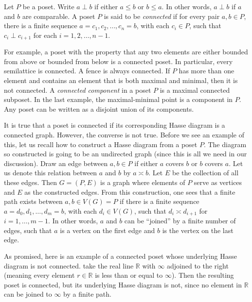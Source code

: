\documentclass[12pt]{article}
\begin{document}
Let $P$ be a poset.  Write $a\perp b$ if either $a\le b$ or $b\le a$.  In other words, $a\perp b$ if $a$ and $b$ are comparable.  A poset $P$ is said to be \emph{connected} if for every pair $a,b\in P$, there is a finite sequence $a=c_1, c_2,\ldots, c_n=b$, with each $c_i\in P$, such that $c_i\perp c_{i+1}$ for each $i=1,2,\ldots,n-1$.

For example, a poset with the property that any two elements are either bounded from above or bounded from below is a connected poset.  In particular, every semilattice is connected.  A fence is always connected.  If $P$ has more than one element and contains an element that is both maximal and minimal, then it is not connected.  A \emph{connected component} in a poset $P$ is a maximal connected subposet.  In the last example, the maximal-minimal point is a component in $P$.  Any poset can be written as a disjoint union of its components.

It is true that a poset is connected if its corresponding Hasse diagram is a connected graph.  However, the converse is not true.  Before we see an example of this, let us recall how to construct a Hasse diagram from a poset $P$.  The diagram so constructed is going to be an undirected graph (since this is all we need in our discussion).  Draw an edge between $a,b\in P$ if either $a$ covers $b$ or $b$ covers $a$.  Let us denote this relation between $a$ and $b$ by $a \asymp b$.  Let $E$ be the collection of all these edges.  Then $G=(P,E)$ is a graph where elements of $P$ serve as vertices and $E$ as the constructed edges.  From this construction, one sees that a finite path exists between $a,b\in V(G)=P$ if there is a finite sequence $a=d_0,d_1,\ldots, d_m=b$, with each $d_i\in V(G)$, such that $d_i\asymp d_{i+1}$ for $i=1,\ldots,m-1$.  In other words, $a$ and $b$ can be ``joined'' by a finite number of edges, such that $a$ is a vertex on the first edge and $b$ is the vertex on the last edge.

As promised, here is an example of a connected poset whose underlying Hasse diagram is not connected.  take the real line $\mathbb{R}$ with $\infty$ adjoined to the right (meaning every element $r\in \mathbb{R}$ is less than or equal to $\infty$).  Then the resulting poset is connected, but its underlying Hasse diagram is not, since no element in $\mathbb{R}$ can be joined to $\infty$ by a finite path.
\end{document}
